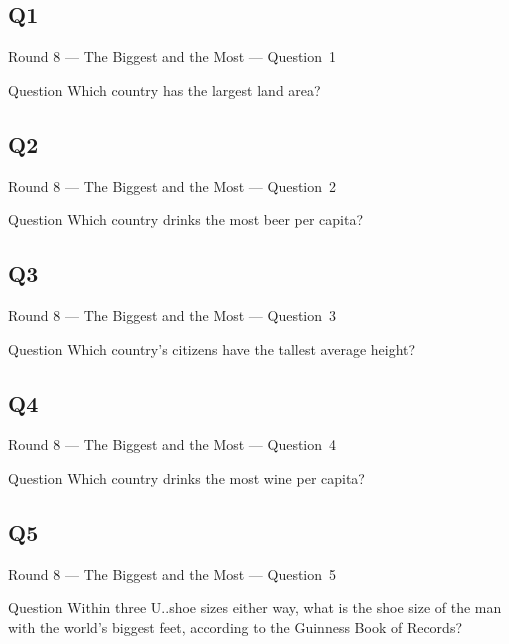 \documentclass[11pt]{beamer}
\begin{document}
\subsection*{Q1}
\begin{frame}[t]{Round 8 --- The Biggest and the Most --- \mbox{Question 1}}
\vspace{-0.5em}
\begin{block}{Question}
Which country has the largest land area?
\end{block}
\end{frame}
\subsection*{Q2}
\begin{frame}[t]{Round 8 --- The Biggest and the Most --- \mbox{Question 2}}
\vspace{-0.5em}
\begin{block}{Question}
Which country drinks the most beer per capita?
\end{block}
\end{frame}
\subsection*{Q3}
\begin{frame}[t]{Round 8 --- The Biggest and the Most --- \mbox{Question 3}}
\vspace{-0.5em}
\begin{block}{Question}
Which country's citizens have the tallest average height?
\end{block}
\end{frame}
\subsection*{Q4}
\begin{frame}[t]{Round 8 --- The Biggest and the Most --- \mbox{Question 4}}
\vspace{-0.5em}
\begin{block}{Question}
Which country drinks the most wine per capita?
\end{block}
\end{frame}
\subsection*{Q5}
\begin{frame}[t]{Round 8 --- The Biggest and the Most --- \mbox{Question 5}}
\vspace{-0.5em}
\begin{block}{Question}
Within three U.\@S.\@ shoe sizes either way, what is the shoe size of the man with the world's biggest feet, according to the Guinness Book of Records?
\end{block}
\end{frame}
\end{document}
